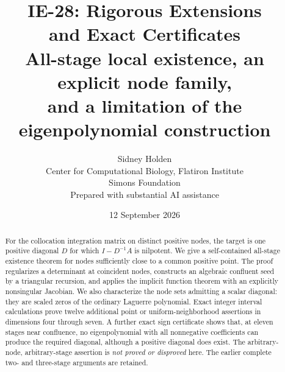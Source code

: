 \documentclass[11pt]{article}
\title{\textbf{IE-28: Rigorous Extensions\\and Exact Certificates}\\[6pt]
\large All-stage local existence, an explicit node family,\\and a limitation of the eigenpolynomial construction}
\author{Sidney Holden\\[3pt]\small Center for Computational Biology, Flatiron Institute\\\small Simons Foundation\\[3pt]\small Prepared with substantial AI assistance}
\date{12 September 2026}
\theoremstyle{remark}\newtheorem{remark}[theorem]{Remark}
\begin{document}
\maketitle\thispagestyle{empty}
\begin{abstract}
For the collocation integration matrix on distinct positive nodes, the target is
one positive diagonal $D$ for which $I-D^{-1}A$ is nilpotent. We give a
self-contained all-stage existence theorem for nodes sufficiently close to a
common positive point. The proof regularizes a determinant at coincident nodes,
constructs an algebraic confluent seed by a triangular recursion, and applies
the implicit function theorem with an explicitly nonsingular Jacobian.
We also characterize the node sets admitting a scalar diagonal: they are scaled
zeros of the ordinary Laguerre polynomial. Exact integer interval calculations
prove twelve additional point or uniform-neighborhood assertions in dimensions
four through seven. A further exact sign certificate shows that, at eleven
stages near confluence, no eigenpolynomial with all nonnegative coefficients
can produce the required diagonal, although a positive diagonal does exist.
The arbitrary-node, arbitrary-stage assertion is \emph{not proved or disproved}
here. The earlier complete two- and three-stage arguments are retained.
\end{abstract}

\begin{center}
\end{center}
\end{document}
